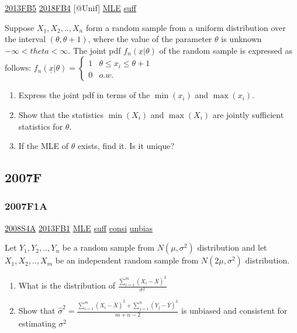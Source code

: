 \documentclass[10pt,twocolumn,portrait]{article}
\begin{document}
\protect\hyperlink{fb5}{2013FB5} \protect\hyperlink{fb4-4}{2018FB4}
{[}@Unif{]} \protect\hyperlink{MLE}{MLE}
\protect\hyperlink{section-6}{suff}

Suppose \(X_1,X_2,..,X_n\) form a random sample from a uniform
distribution over the interval \((\theta,\theta+1)\), where the value of
the parameter \(\theta\) is unknown \(-\infty<theta<\infty\). The joint
pdf \(f_n(\underline{x}|\theta)\) of the random sample is expressed as
follows:
\(f_n(\underline{x}|\theta)=\begin{cases}1&\theta\le x_i\le\theta+1\\0& o.w.\end{cases}\)

\begin{enumerate}
\def\labelenumi{(\alph{enumi})}
\item
  Express the joint pdf in terms of the \(\min(x_i)\) and \(\max(x_i)\).
\item
  Show that the statistics \(\min(X_i)\) and \(\max(X_i)\) are jointly
  sufficient statistics for \(\theta\).
\item
  If the MLE of \(\theta\) exists, find it. Is it unique?
\end{enumerate}

\hypertarget{f-3}{%
\subsection{2007F}\label{f-3}}

\hypertarget{f1a}{%
\subsubsection{2007F1A}\label{f1a}}

\protect\hyperlink{s4a}{2008S4A} \protect\hyperlink{fb1-2}{2013FB1}
\protect\hyperlink{MLE}{MLE} \protect\hyperlink{section-6}{suff}
\protect\hyperlink{section-8}{consi}
\protect\hyperlink{section-4}{unbias}

Let \(Y_1,Y_2,..,Y_{n}\) be a random sample from \(N(\mu,\sigma^2)\)
distribution and let \(X_1,X_2,..,X_{m}\) be an independent random
sample from \(N(2\mu,\sigma^2)\) distribution.

\begin{enumerate}
\def\labelenumi{(\alph{enumi})}
\item
  What is the distribution of
  \(\frac{\sum_{i=1}^m(X_i-\bar X)^2}{\sigma^2}\)
\item
  Show that
  \(\hat\sigma^2=\frac{\sum_{i=1}^m(X_i-\bar X)^2+\sum_{j=1}^n(Y_j-\bar Y)^2}{m+n-2}\)
  is unbiased and consistent for estimating \(\sigma^2\)
\end{enumerate}
\end{document}
